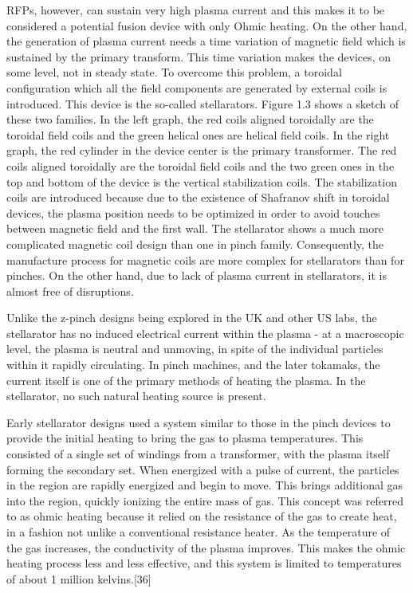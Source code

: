 RFPs, however, can sustain very high plasma current and this makes it to be considered a potential fusion device with only Ohmic heating. On the other hand, the generation of plasma current needs a time variation of magnetic field which is sustained by the primary transform. This time variation makes the devices, on some level, not in steady state. To overcome this problem, a toroidal configuration which all the field components are generated by external coils is introduced. This device is the so-called stellarators. Figure 1.3 shows a sketch of these two families. In the left graph, the red coils aligned toroidally are the toroidal field coils and the green helical ones are helical field coils. In the right graph, the red cylinder in the device center is the primary transformer. The red coils aligned toroidally are the toroidal field coils and the two green ones in the top and bottom of the device is the vertical stabilization coils. The stabilization coils are introduced because due to the existence of Shafranov shift in toroidal devices, the plasma position needs to be optimized in order to avoid touches between magnetic field and the first wall. 
The stellarator shows a much more complicated magnetic coil design than one in pinch family. Consequently, the manufacture process for magnetic coils are more complex for stellarators than for pinches. On the other hand, due to lack of plasma current in stellarators, it is almost free of disruptions.


Unlike the z-pinch designs being explored in the UK and other US labs, the stellarator has no induced electrical current within the plasma - at a macroscopic level, the plasma is neutral and unmoving, in spite of the individual particles within it rapidly circulating. In pinch machines, and the later tokamaks, the current itself is one of the primary methods of heating the plasma. In the stellarator, no such natural heating source is present.

Early stellarator designs used a system similar to those in the pinch devices to provide the initial heating to bring the gas to plasma temperatures. This consisted of a single set of windings from a transformer, with the plasma itself forming the secondary set. When energized with a pulse of current, the particles in the region are rapidly energized and begin to move. This brings additional gas into the region, quickly ionizing the entire mass of gas. This concept was referred to as ohmic heating because it relied on the resistance of the gas to create heat, in a fashion not unlike a conventional resistance heater. As the temperature of the gas increases, the conductivity of the plasma improves. This makes the ohmic heating process less and less effective, and this system is limited to temperatures of about 1 million kelvins.[36]

